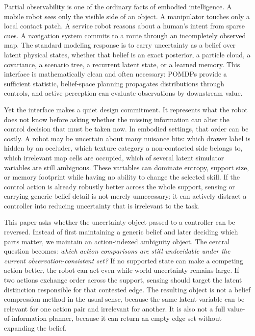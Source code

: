 \documentclass{article}
\begin{document}
Partial observability is one of the ordinary facts of embodied intelligence. A mobile robot sees only the visible side of an object. A manipulator touches only a local contact patch. A service robot reasons about a human's intent from sparse cues. A navigation system commits to a route through an incompletely observed map. The standard modeling response is to carry uncertainty as a belief over latent physical states, whether that belief is an exact posterior, a particle cloud, a covariance, a scenario tree, a recurrent latent state, or a learned memory. This interface is mathematically clean and often necessary: POMDPs provide a sufficient statistic, belief-space planning propagates distributions through controls, and active perception can evaluate observations by downstream value.

Yet the interface makes a quiet design commitment. It represents what the robot does not know before asking whether the missing information can alter the control decision that must be taken now. In embodied settings, that order can be costly. A robot may be uncertain about many nuisance bits: which drawer label is hidden by an occluder, which texture category a non-contacted side belongs to, which irrelevant map cells are occupied, which of several latent simulator variables are still ambiguous. These variables can dominate entropy, support size, or memory footprint while having no ability to change the selected skill. If the control action is already robustly better across the whole support, sensing or carrying generic belief detail is not merely unnecessary; it can actively distract a controller into reducing uncertainty that is irrelevant to the task.

This paper asks whether the uncertainty object passed to a controller can be reversed. Instead of first maintaining a generic belief and later deciding which parts matter, we maintain an action-indexed ambiguity object. The central question becomes: \emph{which action comparisons are still undecidable under the current observation-consistent set?} If no supported state can make a competing action better, the robot can act even while world uncertainty remains large. If two actions exchange order across the support, sensing should target the latent distinction responsible for that contested edge. The resulting object is not a belief compression method in the usual sense, because the same latent variable can be relevant for one action pair and irrelevant for another. It is also not a full value-of-information planner, because it can return an empty edge set without expanding the belief.
\end{document}
